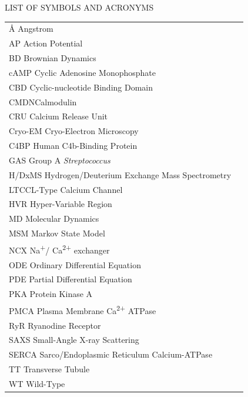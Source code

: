 \documentclass[12pt]{ucsddissertation}
\newcommand\tab[1][1cm]{\hspace*{#1}}
\begin{document}
\tableofcontents

\clearpage
\begin{center}
LIST OF SYMBOLS AND ACRONYMS
\end{center}
{}

{\doublespacing
 \setlength{\parindent}{1pt} 
 

\noindent\begin{tabular}{@{}l l}
\si{\angstrom} \tab[5.45cm]Angstrom\\
AP \tab[5.15cm]Action Potential\\
BD \tab[5.15cm]Brownian Dynamics\\
cAMP \tab[4.6cm]Cyclic Adenosine Monophosphate\\
CBD \tab[4.86cm]Cyclic-nucleotide Binding Domain\\
CMDN\tab[4.54cm]Calmodulin\\
CRU \tab[4.74cm] Calcium Release Unit\\
Cryo-EM \tab[4.09cm]Cryo-Electron Microscopy\\
C4BP \tab[4.6cm] Human C4b-Binding Protein\\
GAS \tab[4.76cm] Group A \textit{Streptococcus}\\
H/DxMS \tab[4.05cm] Hydrogen/Deuterium Exchange Mass Spectrometry\\
LTCC\tab[4.8cm]L-Type Calcium Channel\\
HVR \tab[4.7cm]  Hyper-Variable Region\\
MD \tab[5cm]Molecular Dynamics\\
MSM \tab[4.7cm]Markov State Model\\
NCX \tab[4.7cm] Na\textsuperscript{+}/ Ca\textsuperscript{2+} exchanger\\
ODE \tab[4.84cm]Ordinary Differential Equation\\
PDE \tab[4.87cm]Partial Differential Equation\\
PKA \tab[4.85cm]Protein Kinase A\\
PMCA \tab[4.5cm]Plasma Membrane Ca\textsuperscript{2+} ATPase\\
RyR \tab[4.9cm]Ryanodine Receptor\\
SAXS \tab[4.6cm]Small-Angle X-ray Scattering\\
SERCA \tab[4.33cm]Sarco/Endoplasmic Reticulum Calcium-ATPase\\
TT \tab[5.15cm]Transverse Tubule\\
WT \tab[5.02cm]Wild-Type\\



\end{tabular}}
\end{document}
